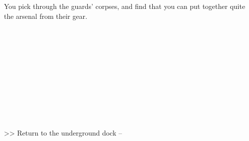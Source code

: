 You pick through the guards’ corpses, and find that you can put together quite the arsenal from their gear.\\
\\
\\
\\
\\
\\
\\
\\
\\
\\
\\
\\

>> Return to the underground dock -- 